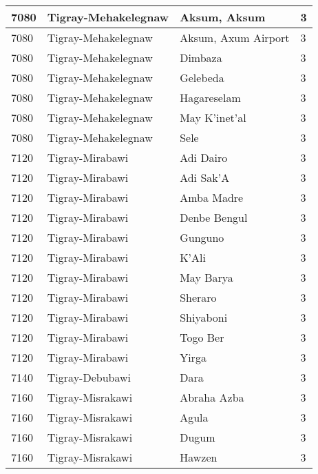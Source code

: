 \documentclass[12pt,a4paper,openbib,titlepage]{report}
\begin{document}
\begin{longtable}{|p{2cm}|p{6.5cm}|p{8cm}|p{1.5cm}|}
\hline 
\rule[-1ex]{0pt}{2.5ex} 7080 & Tigray-Mehakelegnaw & Aksum, Aksum & 3 \\
\hline 
\rule[-1ex]{0pt}{2.5ex} 7080 & Tigray-Mehakelegnaw & Aksum, Axum Airport & 3 \\
\hline 
\rule[-1ex]{0pt}{2.5ex} 7080 & Tigray-Mehakelegnaw & Dimbaza & 3 \\
\hline 
\rule[-1ex]{0pt}{2.5ex} 7080 & Tigray-Mehakelegnaw & Gelebeda & 3 \\
\hline 
\rule[-1ex]{0pt}{2.5ex} 7080 & Tigray-Mehakelegnaw & Hagareselam & 3 \\
\hline 
\rule[-1ex]{0pt}{2.5ex} 7080 & Tigray-Mehakelegnaw & May K'inet'al & 3 \\
\hline 
\rule[-1ex]{0pt}{2.5ex} 7080 & Tigray-Mehakelegnaw & Sele & 3 \\
\hline 
\rule[-1ex]{0pt}{2.5ex} 7120 & Tigray-Mirabawi & Adi Dairo & 3 \\
\hline 
\rule[-1ex]{0pt}{2.5ex} 7120 & Tigray-Mirabawi & Adi Sak'A & 3 \\
\hline 
\rule[-1ex]{0pt}{2.5ex} 7120 & Tigray-Mirabawi & Amba Madre & 3 \\
\hline 
\rule[-1ex]{0pt}{2.5ex} 7120 & Tigray-Mirabawi & Denbe Bengul & 3 \\
\hline 
\rule[-1ex]{0pt}{2.5ex} 7120 & Tigray-Mirabawi & Gunguno & 3 \\
\hline 
\rule[-1ex]{0pt}{2.5ex} 7120 & Tigray-Mirabawi & K'Ali & 3 \\
\hline 
\rule[-1ex]{0pt}{2.5ex} 7120 & Tigray-Mirabawi & May Barya & 3 \\
\hline 
\rule[-1ex]{0pt}{2.5ex} 7120 & Tigray-Mirabawi & Sheraro & 3 \\
\hline 
\rule[-1ex]{0pt}{2.5ex} 7120 & Tigray-Mirabawi & Shiyaboni & 3 \\
\hline 
\rule[-1ex]{0pt}{2.5ex} 7120 & Tigray-Mirabawi & Togo Ber & 3 \\
\hline 
\rule[-1ex]{0pt}{2.5ex} 7120 & Tigray-Mirabawi & Yirga & 3 \\
\hline 
\rule[-1ex]{0pt}{2.5ex} 7140 & Tigray-Debubawi & Dara & 3 \\
\hline 
\rule[-1ex]{0pt}{2.5ex} 7160 & Tigray-Misrakawi & Abraha Azba & 3 \\
\hline 
\rule[-1ex]{0pt}{2.5ex} 7160 & Tigray-Misrakawi & Agula & 3 \\
\hline 
\rule[-1ex]{0pt}{2.5ex} 7160 & Tigray-Misrakawi & Dugum & 3 \\
\hline 
\rule[-1ex]{0pt}{2.5ex} 7160 & Tigray-Misrakawi & Hawzen & 3 \\

\end{longtable}
\end{document}
